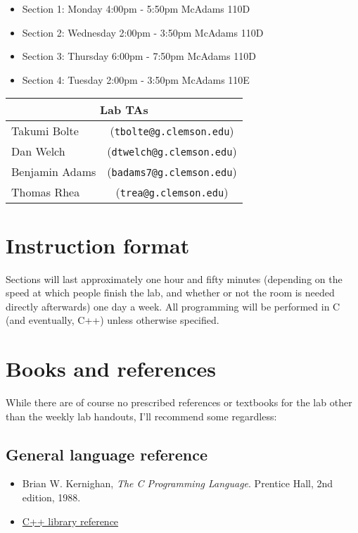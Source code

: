 \documentclass[12pt]{article}
\begin{document}
\begin{itemize}
\item Section 1: Monday 4:00pm - 5:50pm McAdams 110D
\item Section 2: Wednesday 2:00pm - 3:50pm McAdams 110D
\item Section 3: Thursday 6:00pm - 7:50pm McAdams 110D
\item Section 4: Tuesday 2:00pm - 3:50pm McAdams 110E
\end{itemize}

\begin{tabular}{l c}
	\toprule
		\multicolumn{2}{c}{Lab TAs} \\
	\midrule
		Takumi Bolte		& (\texttt{tbolte@g.clemson.edu}) \\
		Dan Welch		& (\texttt{dtwelch@g.clemson.edu})  \\
		Benjamin Adams	& (\texttt{badams7@g.clemson.edu}) \\
		Thomas Rhea		& (\texttt{trea@g.clemson.edu})  \\
	\bottomrule
\end{tabular}
\section{Instruction format}

Sections will last approximately one hour and fifty minutes (depending on the speed at which people finish the lab, and whether or not the room is needed directly afterwards) one day a week. All programming will be performed in C (and eventually, C++) unless otherwise specified.

\section{Books and references}

While there are of course no prescribed references or textbooks for the lab other than the weekly lab handouts, I'll recommend some regardless:

\subsection{General language reference}
\begin{itemize}
\item Brian W. Kernighan, \textit{The C Programming Language}. Prentice Hall, 2nd edition, 1988.

\item \href{http://www.cplusplus.com/reference/}{C++ library reference}
\end{itemize}
\end{document}
